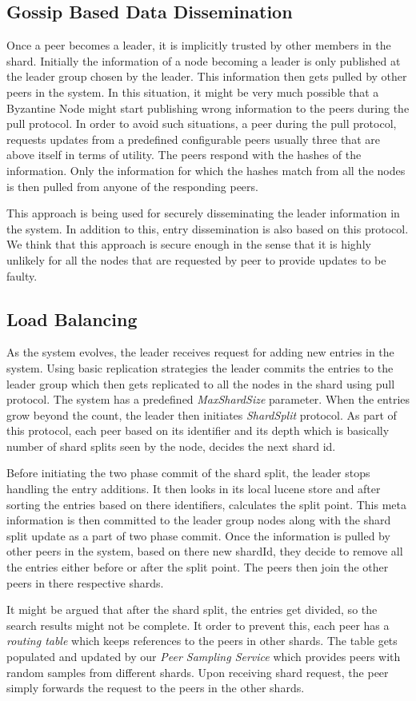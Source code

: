 \documentclass[12pt,a4paper,twoside,openright]{book}
\begin{document}
\subsection{Gossip Based Data Dissemination}
Once a peer becomes a leader, it is implicitly trusted by other members in the shard.
Initially the information of a node becoming a leader is only published at the leader group chosen by the leader. This information then gets pulled by other peers in the system. In this situation, it might be very much possible that a Byzantine Node might start publishing wrong information to the peers during the pull protocol. In order to avoid such situations, a peer during the pull protocol, requests updates from a predefined configurable peers usually three that are above itself in terms of utility.  The peers respond with the hashes of the information. Only the information for which the hashes match from all the nodes is then pulled from anyone of the responding peers. 
\par This approach is being used for securely disseminating the leader information in the system. In addition to this, entry dissemination is also based on this protocol. We think that this approach is secure enough in the sense that it is highly unlikely for all the nodes that are requested by peer to provide updates to be faulty.


\subsection{Load Balancing}

As the system evolves, the leader receives request for adding new entries in the system. Using basic replication strategies the leader commits the entries to the leader group which then gets replicated to all the nodes in the shard using pull protocol. The system has a predefined \textit{MaxShardSize} parameter. When the entries grow beyond the count, the leader then initiates \textit{ShardSplit} protocol. As part of this protocol, each peer based on its identifier and its depth which is basically number of shard splits seen by the node, decides the next shard id. 
\par Before initiating the two phase commit of the shard split, the leader stops handling the entry additions. It then looks in its local lucene store and after sorting the entries based on there identifiers, calculates the split point. This meta information is then committed to the leader group nodes along with the shard split update as a part of two phase commit. Once the information is pulled by other peers in the system, based on there new shardId, they decide to remove all the entries either before or after the split point. The peers then join the other peers in there respective shards. 
\par It might be argued that after the shard split, the entries get divided, so the search results might not be complete. It order to prevent this, each peer has a \textit{routing table} which keeps references to the peers in other shards. The table gets populated and updated by our \textit{Peer Sampling Service} which provides peers with random samples from different shards. Upon receiving shard request, the peer simply forwards the request to the peers in the other shards.
\end{document}
